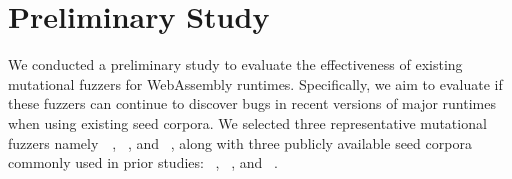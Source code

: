 \section{Preliminary Study}
% 

We conducted a preliminary study to evaluate the effectiveness of existing mutational fuzzers for WebAssembly runtimes. Specifically, we aim to evaluate if these fuzzers can continue to discover bugs in recent versions of major runtimes when using existing seed corpora. We selected three representative mutational fuzzers namely~\wadiff{}~\cite{zhou2023wadiff}, \wasmaker{}~\cite{cao2024wasmaker}, and \wapplique{}~\cite{zhao2024wapplique}, along with three publicly available seed corpora commonly used in prior studies: \llvmbench{}~\cite{zhao2024wapplique}, \wasmbench{}~\cite{cao2024wasmaker}, and \specbench{}~\cite{zhou2023wadiff}.


    
    
    
